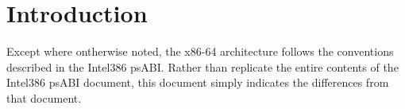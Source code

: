 
\chapter{Introduction}

Except where ontherwise noted, the x86-64 architecture follows the
conventions described in the Intel386 psABI.  Rather than replicate
the entire contents of the Intel386 psABI document, this document
simply indicates the differences from that document.

